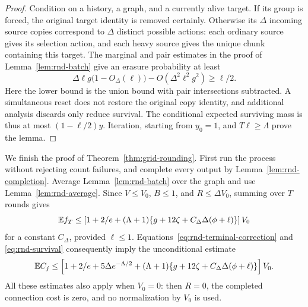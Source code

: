 \begin{proof}
Condition on a history, a graph, and a currently alive target.
If its group is forced, the original target identity is removed
certainly.  Otherwise its $\Delta$ incoming source copies correspond
to $\Delta$ distinct possible actions: each ordinary source gives
its selection action, and each heavy source gives the unique chunk
containing this target.  The marginal and pair estimates in the
proof of Lemma~\ref{lem:rnd-batch} give an erasure probability at least
\[
 \Delta\ell g\bigl(1-O_\Delta(\ell)\bigr)
       -O(\Delta^2\ell^2g^2)\ge\ell/2.
\]
Here the lower bound is the union bound with pair intersections
subtracted.  A simultaneous reset does not restore the original
copy identity, and additional analysis discards only reduce survival.
The conditional expected surviving mass is thus at most
$(1-\ell/2)y$.  Iteration, starting from $y_0=1$, and $T\ell\ge\Lambda$
prove the lemma.
\end{proof}

We finish the proof of Theorem~\ref{thm:grid-rounding}.
First run the process without rejecting count failures, and complete
every output by Lemma~\ref{lem:rnd-completion}.  Average
Lemma~\ref{lem:rnd-batch} over the graph and use
Lemma~\ref{lem:rnd-average}.  Since $V\le V_0$, $B\le1$, and
$R\le\Delta V_0$, summing over $T$ rounds gives
\[
 \mathbb E f_T\le
 \left[1+2/e+(\Lambda+1)
       \{g+12\zeta+C_\Delta\Delta(\phi+\ell)\}\right]V_0
\]
for a constant $C_\Delta$, provided $\ell\le1$.
Equations~\eqref{eq:rnd-terminal-correction} and
\eqref{eq:rnd-survival} consequently imply the unconditional estimate
\begin{equation}\label{eq:rnd-total-error}
 \mathbb E C_j\le
 \left[1+2/e+5\Delta e^{-\Lambda/2}
       +(\Lambda+1)\{g+12\zeta+C_\Delta\Delta(\phi+\ell)\}\right]V_0.
\end{equation}
All these estimates also apply when $V_0=0$: then $R=0$, the completed
connection cost is zero, and no normalization by $V_0$ is used.

